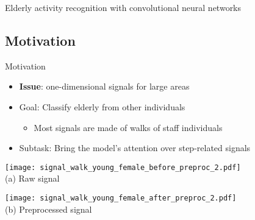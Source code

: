 \begingroup
{}  %
\begin{frame}[noframenumbering]{}
    \centering
    \vspace{3cm}
    \Huge
    \textcolor{myblue}{Elderly activity recognition with convolutional neural networks}
\end{frame}
\endgroup


\subsection{Motivation}

\begin{frame}{Motivation}{}
\begin{itemize}
    \item \textbf{Issue}: one-dimensional signals for large areas
    \item Goal: Classify elderly from other individuals
    \begin{itemize}
        \item Most signals are made of walks of staff individuals
    \end{itemize}
    \item {Subtask}: Bring the model's attention over step-related signals
\end{itemize}

\pause
    \begin{minipage}{\linewidth}
        \centering
        \begin{minipage}{0.49\linewidth}
            \centering
            \texttt{[image: signal\_walk\_young\_female\_before\_preproc\_2.pdf]}\\
            {\small (a)\; Raw signal}
        \end{minipage}
        \begin{minipage}{0.49\linewidth}
            \centering
            \texttt{[image: signal\_walk\_young\_female\_after\_preproc\_2.pdf]}\\
            {\small (b)\; Preprocessed signal}
        \end{minipage}
    \end{minipage}


\end{frame}
